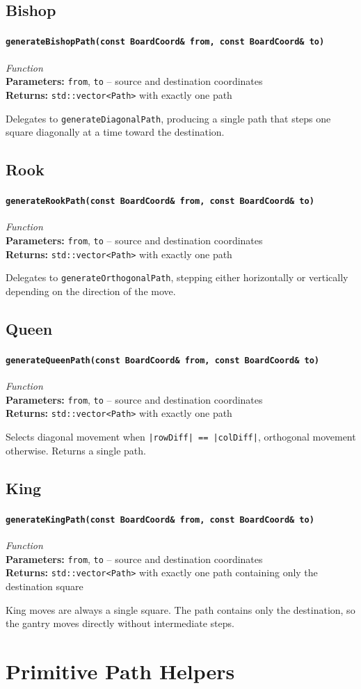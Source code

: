 \documentclass[11pt,a4paper]{report}
\newcommand{\function}[4]{%
    \paragraph{\texttt{#1}} \hfill \textit{#2}\\
    \textbf{Parameters:} #3\\
    \textbf{Returns:} #4
}
\begin{document}
\subsection{Bishop}

\function{generateBishopPath(const BoardCoord\& from, const BoardCoord\& to)}{Function}{\texttt{from}, \texttt{to} -- source and destination coordinates}{\texttt{std::vector<Path>} with exactly one path}

Delegates to \texttt{generateDiagonalPath}, producing a single path that steps one square diagonally at a time toward the destination.

\subsection{Rook}

\function{generateRookPath(const BoardCoord\& from, const BoardCoord\& to)}{Function}{\texttt{from}, \texttt{to} -- source and destination coordinates}{\texttt{std::vector<Path>} with exactly one path}

Delegates to \texttt{generateOrthogonalPath}, stepping either horizontally or vertically depending on the direction of the move.

\subsection{Queen}

\function{generateQueenPath(const BoardCoord\& from, const BoardCoord\& to)}{Function}{\texttt{from}, \texttt{to} -- source and destination coordinates}{\texttt{std::vector<Path>} with exactly one path}

Selects diagonal movement when \texttt{|rowDiff| == |colDiff|}, orthogonal movement otherwise. Returns a single path.

\subsection{King}

\function{generateKingPath(const BoardCoord\& from, const BoardCoord\& to)}{Function}{\texttt{from}, \texttt{to} -- source and destination coordinates}{\texttt{std::vector<Path>} with exactly one path containing only the destination square}

King moves are always a single square. The path contains only the destination, so the gantry moves directly without intermediate steps.

\section{Primitive Path Helpers}
\end{document}
